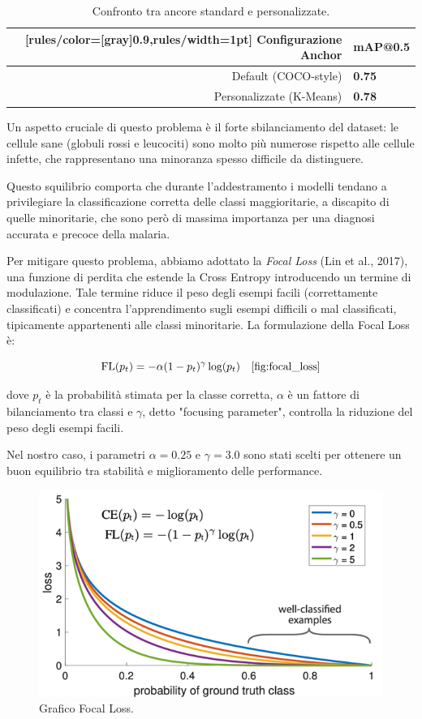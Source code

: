 \documentclass[minted, draw]{../tex/hebdomon}
\begin{document}
\begin{table}[!ht]
	\centering
	\begin{NiceTabular}{rX}[rules/color=[gray]{0.9},rules/width=1pt]
		\CodeBefore
		\Body
		\toprule
		\textbf{Configurazione Anchor} & \textbf{mAP@0.5} \\
		\midrule
		Default (COCO-style)         & \textbf{0.75} \\
		Personalizzate (K-Means)     & \textbf{0.78} \\
		\bottomrule
	\end{NiceTabular}
	\caption{Confronto tra ancore standard e personalizzate.}
	\label{tab:custom_anchors}
\end{table}


Un aspetto cruciale di questo problema è il forte sbilanciamento del dataset: le cellule sane (globuli rossi e leucociti) sono molto più numerose rispetto alle cellule infette, che rappresentano una minoranza spesso difficile da distinguere.

Questo squilibrio comporta che durante l’addestramento i modelli tendano a privilegiare la classificazione corretta delle classi maggioritarie, a discapito di quelle minoritarie, che sono però di massima importanza per una diagnosi accurata e precoce della malaria.

Per mitigare questo problema, abbiamo adottato la \textit{Focal Loss} (Lin et al., 2017), una funzione di perdita che estende la Cross Entropy introducendo un termine di modulazione. Tale termine riduce il peso degli esempi facili (correttamente classificati) e concentra l’apprendimento sugli esempi difficili o mal classificati, tipicamente appartenenti alle classi minoritarie. La formulazione della Focal Loss è:

\[
\text{FL}(p_t) = -\alpha (1 - p_t)^\gamma \log(p_t) \quad \ref{fig:focal_loss}
\]

dove \( p_t \) è la probabilità stimata per la classe corretta, \(\alpha\) è un fattore di bilanciamento tra classi e \(\gamma\), detto "focusing parameter", controlla la riduzione del peso degli esempi facili.

Nel nostro caso, i parametri \(\alpha = 0.25\) e \(\gamma = 3.0\) sono stati scelti per ottenere un buon equilibrio tra stabilità e miglioramento delle performance.




%
\begin{figure}[H]
	\centering
	\includegraphics[width=.6\linewidth]{figures/focal_loss.png}
	\caption{Grafico Focal Loss.}
	\label{fig:focal_loss}
\end{figure}
%
\end{document}
